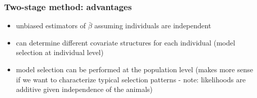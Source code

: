 \documentclass[10pt]{beamer}
\begin{document}
% 
% 
% 
% 
% 
% 
% 


% 
% 
% 
% 


\begin{frame}[fragile]
\frametitle{Two-stage method: advantages}

\begin{itemize}
\item unbiased estimators of $\bar{\beta}$ assuming individuals are independent
\item can determine different covariate structures for each individual (model selection at individual level)
\item model selection can be performed at the population level (makes more sense if we want to characterize typical selection patterns - note: likelihoods are additive given independence of the animals)
\end{itemize}

\end{frame}

\end{document}
